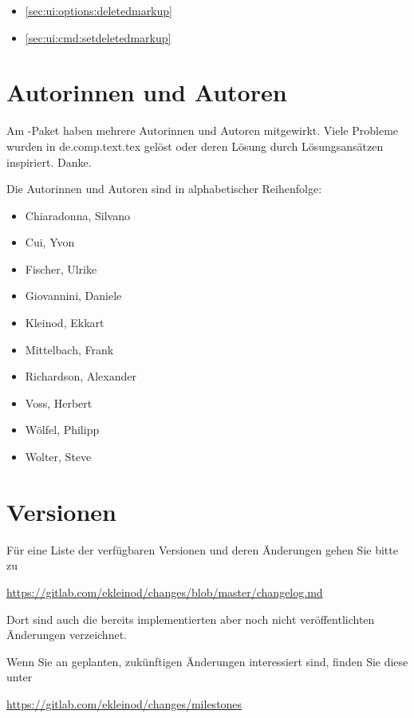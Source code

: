 \begin{itemize}
	\item \autoref{sec:ui:options:deletedmarkup}
	\item \autoref{sec:ui:cmd:setdeletedmarkup}
\end{itemize}

\cleardoublepage
\section{Autorinnen und Autoren}
\label{sec:authors}

Am -Paket haben mehrere Autorinnen und Autoren mitgewirkt.
Viele Probleme wurden in de.comp.text.tex gelöst oder deren Lösung durch Lösungsansätzen inspiriert.
Danke.

Die Autorinnen und Autoren sind in alphabetischer Reihenfolge:
\begin{itemize}
	\item Chiaradonna, Silvano
	\item Cui, Yvon
	\item Fischer, Ulrike
	\item Giovannini, Daniele
	\item Kleinod, Ekkart
	\item Mittelbach, Frank
	\item Richardson, Alexander
	\item Voss, Herbert
	\item Wölfel, Philipp
	\item Wolter, Steve
\end{itemize}



\cleardoublepage
\section{Versionen}
\label{sec:versions}

Für eine Liste der verfügbaren Versionen und deren Änderungen gehen Sie bitte zu

\url{https://gitlab.com/ekleinod/changes/blob/master/changelog.md}

Dort sind auch die bereits implementierten aber noch nicht veröffentlichten Änderungen verzeichnet.

Wenn Sie an geplanten, zukünftigen Änderungen interessiert sind, finden Sie diese unter

\url{https://gitlab.com/ekleinod/changes/milestones}



